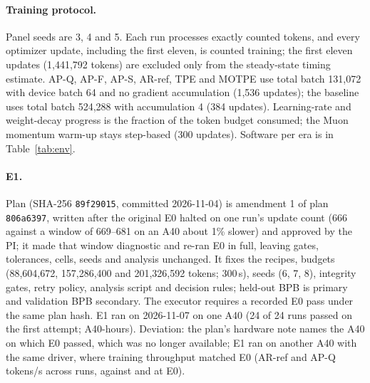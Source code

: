 \documentclass{article}
\begin{document}
\paragraph{Training protocol.} Panel seeds are 3, 4 and 5. Each run processes exactly \CRPanelBudget{} counted tokens, and every optimizer update, including the first eleven, is counted training; the first eleven updates (1,441,792 tokens) are excluded only from the steady-state timing estimate. AP-Q, AP-F, AP-S, AR-ref, TPE and MOTPE use total batch 131,072 with device batch 64 and no gradient accumulation (1,536 updates); the baseline uses total batch 524,288 with accumulation 4 (384 updates). Learning-rate and weight-decay progress is the fraction of the token budget consumed; the Muon \citep{jordan2024muon} momentum warm-up stays step-based (300 updates). Software per era is in Table~\ref{tab:env}.

\paragraph{E1.} Plan  (SHA-256 \texttt{89f29015}, committed 2026-11-04) is amendment 1 of plan \texttt{806a6397}, written after the original E0 halted on one run's update count (666 against a window of 669--681 on an A40 about 1\% slower) and approved by the PI; it made that window diagnostic and re-ran E0 in full, leaving gates, tolerances, cells, seeds and analysis unchanged. It fixes the recipes, budgets (88,604,672, 157,286,400 and 201,326,592 tokens; 300\,s), seeds (6, 7, 8), integrity gates, retry policy, analysis script and decision rules; held-out BPB is primary and validation BPB secondary. The executor requires a recorded E0 pass under the same plan hash. E1 ran on 2026-11-07 on one A40 (24 of 24 runs passed on the first attempt; \CREOneHours{} A40-hours). Deviation: the plan's hardware note names the A40 on which E0 passed, which was no longer available; E1 ran on another A40 with the same driver, where training throughput matched E0 (AR-ref \CREOneTputAR{} and AP-Q \CREOneTputAP{} tokens/s across runs, against \CREZeroTputAR{} and \CREZeroTputAP{} at E0).
\end{document}
